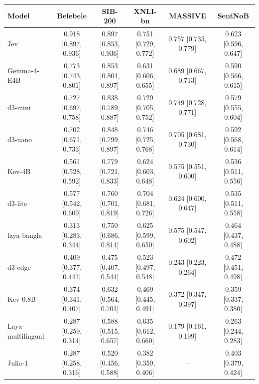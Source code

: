 \begin{tabular}{@{}lccccc@{}}\toprule
Model & Belebele & SIB-200 & XNLI-bn & MASSIVE & SentNoB \\\midrule
Jev & 0.918 [0.897, 0.936] & 0.897 [0.853, 0.936] & 0.751 [0.729, 0.772] & 0.757 [0.735, 0.779] & 0.623 [0.596, 0.647] \\
Gemma-4-E4B & 0.773 [0.743, 0.801] & 0.853 [0.804, 0.897] & 0.631 [0.606, 0.655] & 0.689 [0.667, 0.713] & 0.590 [0.566, 0.615] \\
d3-mini & 0.727 [0.697, 0.758] & 0.838 [0.789, 0.887] & 0.729 [0.705, 0.752] & 0.749 [0.728, 0.771] & 0.579 [0.555, 0.604] \\
d3-nano & 0.702 [0.671, 0.733] & 0.848 [0.799, 0.897] & 0.746 [0.725, 0.768] & 0.705 [0.681, 0.730] & 0.592 [0.568, 0.614] \\
Kev-4B & 0.561 [0.528, 0.592] & 0.779 [0.721, 0.833] & 0.624 [0.603, 0.648] & 0.575 [0.551, 0.600] & 0.536 [0.511, 0.556] \\
d3-lite & 0.577 [0.542, 0.609] & 0.760 [0.701, 0.819] & 0.704 [0.681, 0.726] & 0.624 [0.600, 0.647] & 0.535 [0.511, 0.558] \\
laya-bangla & 0.313 [0.283, 0.344] & 0.750 [0.686, 0.814] & 0.625 [0.599, 0.650] & 0.575 [0.547, 0.602] & 0.464 [0.437, 0.488] \\
d3-edge & 0.409 [0.377, 0.441] & 0.475 [0.407, 0.544] & 0.523 [0.497, 0.548] & 0.243 [0.223, 0.264] & 0.472 [0.451, 0.498] \\
Kev-0.8B & 0.374 [0.341, 0.407] & 0.632 [0.564, 0.701] & 0.469 [0.445, 0.491] & 0.372 [0.347, 0.397] & 0.359 [0.337, 0.380] \\
Laya-multilingual & 0.287 [0.259, 0.314] & 0.588 [0.515, 0.657] & 0.635 [0.612, 0.660] & 0.179 [0.161, 0.199] & 0.263 [0.244, 0.283] \\
Julia-1 & 0.287 [0.258, 0.316] & 0.520 [0.456, 0.588] & 0.382 [0.359, 0.406] & -- & 0.403 [0.379, 0.424] \\
\bottomrule\end{tabular}
